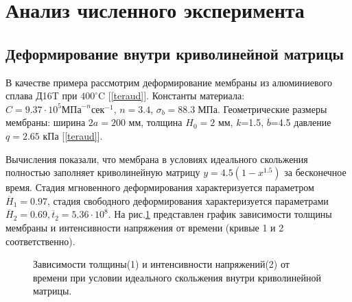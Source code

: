 \section{Анализ численного эксперимента\label{section_2}}
\subsection{Деформирование внутри криволинейной матрицы}
	В качестве примера рассмотрим деформирование мембраны из алюминиевого сплава Д16T при $400^\circ\text{C}$ [\ref{teraud}]. Константы материала: 
   $C=9.37\cdot10^5 \text{МПа}^{-n}\text{сек}^{-1}$, $n=3.4$, $\sigma_b = 88.3\; \text{МПа}$. 
   Геометрические размеры мембраны: ширина $2a=200$ мм, толщина $H_0=2$ мм, $k$=1.5, $\overline{b}$=4.5 давление $q=2.65$ кПа [\ref{teraud}].  
   
   Вычисления показали, что мембрана в условиях идеального скольжения полностью заполняет криволинейную матрицу $y=4.5(1-x^{1.5})$ за бесконечное время. 
   Стадия мгновенного деформирования характеризуется параметром $\overline{H}_1 = 0.97$, 
   стадия свободного деформирования характеризуется параметрами $\overline{H}_2 = 0.69, \overline{t}_2 = 5.36 \cdot 10^8$.
   На рис.\ref{quad_sliging} представлен график зависимости толщины мембраны и интенсивности напряжения от времени
   (кривые 1 и 2 соответственно).
   
   		\begin{figure}[h!]	
				\def\svgwidth{\columnwidth}
				\caption{Зависимости толщины(1) и интенсивности напряжений(2) от времени при условии идеального скольжения внутри криволинейной матрицы.} 
				\label{quad_sliging}
		\end{figure}

